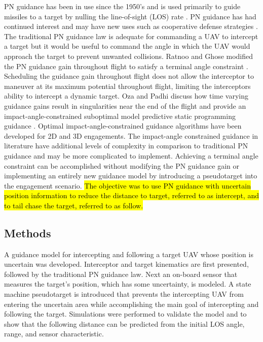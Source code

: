 \documentclass[conference]{IEEEtran}
\begin{document}
PN guidance has been in use since the 1950's \cite{zarchan} and is used primarily to guide missiles to a target by nulling the line-of-sight (LOS) rate \cite{shneydor1998missile,yanushevsky2007modern}. PN guidance has had continued interest and may have new uses such as cooperative defense strategies \cite{isaac}. The traditional PN guidance law is adequate for commanding a UAV to intercept a target but it would be useful to command the angle in which the UAV would approach the target to prevent unwanted collisions. Ratnoo and Ghose modified the PN guidance gain throughout flight to satisfy a terminal angle constraint \cite{ratnoo2009satisfying}. Scheduling the guidance gain throughout flight does not allow the interceptor to maneuver at its maximum potential throughout flight, limiting the interceptors ability to intercept a dynamic target. Oza and Padhi discuss how time varying guidance gains result in singularities near the end of the flight and provide an impact-angle-constrained suboptimal model predictive static programming guidance \cite{oza2012impact}. Optimal impact-angle-constrained guidance algorithms have been developed for 2D \cite{park2013optimal} and 3D \cite{kumar2014three} engagements. The impact-angle constrained guidance in literature have additional levels of complexity in comparison to traditional PN guidance and may be more complicated to implement. Achieving a terminal angle constraint can be accomplished without modifying the PN guidance gain or implementing an entirely new guidance model by introducing a pseudotarget into the engagement scenario.\hl{ The objective was to use PN guidance with uncertain position information to reduce the distance to target, referred to as intercept, and to tail chase the target, referred to as follow.}




\subsection{Methods}
A guidance model for intercepting and following a target UAV whose position is uncertain was developed. 
Interceptor and target kinematics are first presented, followed by the traditional PN guidance law. Next an on-board sensor that measures the target's position, which has some uncertainty, is modeled. A state machine pseudotarget is introduced that prevents the intercepting UAV from entering the uncertain area while accomplishing the main goal of intercepting and following the target. Simulations were performed to validate the model and to show that the following distance can be predicted from the initial LOS angle, range, and sensor characteristic.
\end{document}

